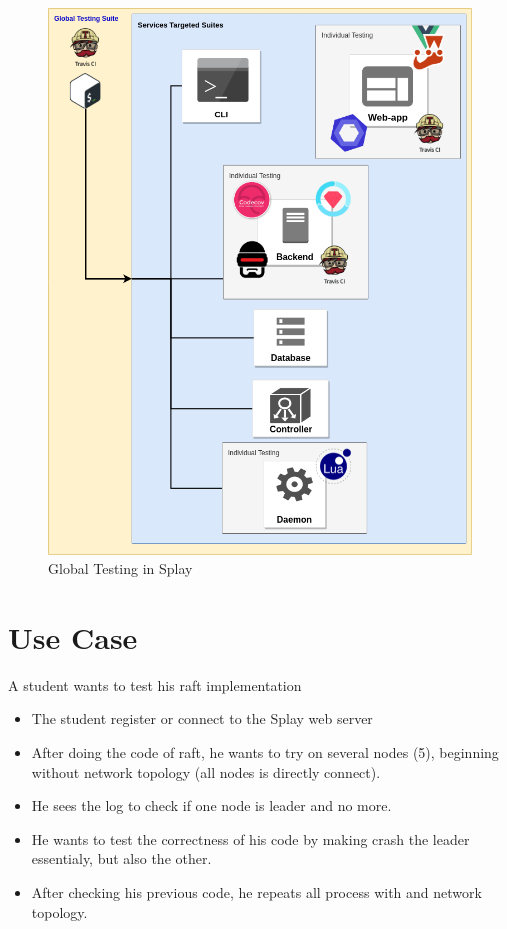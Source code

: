 \documentclass{eplmastersthesis}
\begin{document}
      \begin{figure}[H]
        \centering
        \includegraphics[scale=0.6]{figures/global_testing.png}
        \caption{\label{global_testing} Global Testing in Splay}
      \end{figure}

  \chapter{Use Case}
  A student wants to test his raft implementation
    \begin{itemize}
      \item The student register or connect to the Splay web server
      \item After doing the code of raft, he wants to try on several nodes (5),
      beginning without network topology (all nodes is directly connect).
      \item He sees the log to check if one node is leader and no more.
      \item He wants to test the correctness of his code by making crash the leader essentialy,
      but also the other.
      \item After checking his previous code, he repeats all process with and network topology.
    \end{itemize}
\end{document}
